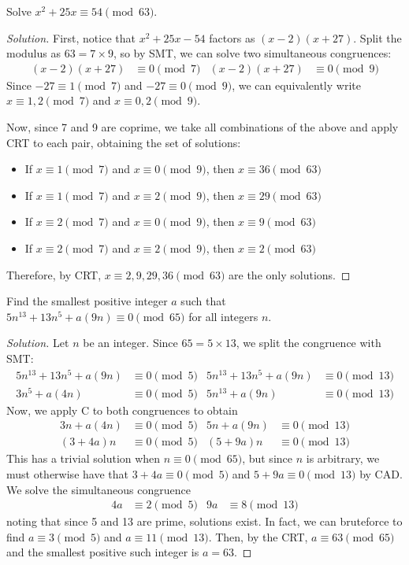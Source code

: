 \documentclass{agony}
\begin{document}
\question Solve $x^2 + 25x \equiv 54 \pmod{63}$.
\begin{proof}[Solution]
  First, notice that $x^2+25x-54$ factors as $(x-2)(x+27)$.
  Split the modulus as $63 = 7 \times 9$,
  so by SMT, we can solve two simultaneous congruences:
  \begin{align*}
    (x-2)(x+27) & \equiv 0 \pmod{7} & (x-2)(x+27) & \equiv 0 \pmod{9}
  \end{align*}
  Since $-27 \equiv 1 \pmod7$ and $-27 \equiv 0 \pmod9$,
  we can equivalently write $x \equiv 1,2 \pmod7$ and $x \equiv 0,2 \pmod9$.

  Now, since 7 and 9 are coprime,
  we take all combinations of the above and apply CRT to each pair,
  obtaining the set of solutions:
  \begin{itemize}
    \item If $x \equiv 1 \pmod7$ and $x \equiv 0 \pmod9$, then $x \equiv 36 \pmod{63}$
    \item If $x \equiv 1 \pmod7$ and $x \equiv 2 \pmod9$, then $x \equiv 29 \pmod{63}$
    \item If $x \equiv 2 \pmod7$ and $x \equiv 0 \pmod9$, then $x \equiv 9 \pmod{63}$
    \item If $x \equiv 2 \pmod7$ and $x \equiv 2 \pmod9$, then $x \equiv 2 \pmod{63}$
  \end{itemize}
  Therefore, by CRT, $x \equiv 2,9,29,36 \pmod{63}$ are the only solutions.
\end{proof}


\question Find the smallest positive integer $a$ such that
$5n^{13}+13n^5+a(9n) \equiv 0 \pmod{65}$ for all integers $n$.
\begin{proof}[Solution]
  Let $n$ be an integer.
  Since $65 = 5 \times 13$, we split the congruence with SMT:
  \begin{align*}
    5n^{13}+13n^5+a(9n) & \equiv 0 \pmod{5} & 5n^{13}+13n^5+a(9n) & \equiv 0 \pmod{13} \\
    3n^5+a(4n)          & \equiv 0 \pmod{5} & 5n^{13}+a(9n)       & \equiv 0 \pmod{13}
  \end{align*}
  Now, we apply C\FLT{} to both congruences to obtain
  \begin{align*}
    3n+a(4n) & \equiv 0 \pmod{5} & 5n+a(9n) & \equiv 0 \pmod{13} \\
    (3+4a)n  & \equiv 0 \pmod{5} & (5+9a)n  & \equiv 0 \pmod{13}
  \end{align*}
  This has a trivial solution when $n \equiv 0 \pmod{65}$, but since $n$ is arbitrary,
  we must otherwise have that $3+4a \equiv 0 \pmod 5$ and $5+9a \equiv 0 \pmod{13}$ by CAD\@.
  We solve the simultaneous congruence
  \begin{align*}
    4a & \equiv 2 \pmod{5} & 9a & \equiv 8 \pmod{13}
  \end{align*}
  noting that since 5 and 13 are prime, solutions exist.
  In fact, we can bruteforce to find $a \equiv 3 \pmod 5$ and $a \equiv 11 \pmod{13}$.
  Then, by the CRT, $a \equiv 63 \pmod{65}$ and the smallest positive such integer is $a = 63$.
\end{proof}
\end{document}
